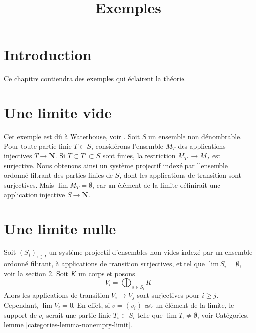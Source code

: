 

%


\title{Exemples}


\maketitle

\label{section-phantom}

\tableofcontents

\section{Introduction}
\label{section-introduction}

\noindent
Ce chapitre contiendra des exemples qui éclairent la théorie.





\section{Une limite vide}
\label{section-empty-limit}

\noindent
Cet exemple est dû à Waterhouse, voir \cite{Waterhouse}.
Soit $S$ un ensemble non dénombrable. Pour toute partie finie
$T \subset S$, considérons l'ensemble $M_T$ des applications injectives $T \to \mathbf{N}$.
Si $T \subset T' \subset S$ sont finies, la restriction $M_{T'} \to M_T$
est surjective. Nous obtenons ainsi un système projectif indexé par
l'ensemble ordonné filtrant des parties finies de $S$,
dont les applications de transition sont surjectives.
Mais $\lim M_T = \emptyset$, car un élément de la limite
définirait une application injective $S \to \mathbf{N}$.



\section{Une limite nulle}
\label{section-zero-limit}

\noindent
Soit $(S_i)_{i \in I}$ un système projectif d'ensembles non vides
indexé par un ensemble ordonné filtrant, à applications de transition surjectives,
et tel que $\lim S_i = \emptyset$, voir la section \ref{section-empty-limit}.
Soit $K$ un corps et posons
$$
V_i = \bigoplus\nolimits_{s \in S_i} K
$$
Alors les applications de transition $V_i \to V_j$ sont surjectives pour $i \geq j$.
Cependant, $\lim V_i = 0$. En effet, si $v = (v_i)$ est un élément de la
limite, le support de $v_i$ serait une partie finie $T_i \subset S_i$
telle que $\lim T_i \not = \emptyset$, voir
Catégories, lemme \ref{categories-lemma-nonempty-limit}.

